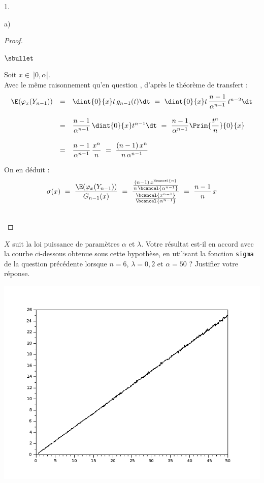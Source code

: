 \documentclass[11pt]{article}%
\begin{document}
\begin{noliste}{1.}
\begin{noliste}{a)}
\begin{proof}
\begin{noliste}{$\sbullet$}
	\item Soit $x \in \ ]0, \alpha[$.\\
	Avec le même raisonnement qu'en question , d'après 
	le théorème de transfert :
	\[
	  \begin{array}{rcl}
	    \E(\varphi_x(Y_{n-1})) & = & \dint{0}{x} t \, g_{n-1}(t) \dt
	    \ = \ \dint{0}{x} t \, \dfrac{n-1}{\alpha^{n-1}} \,
	    t^{n-2} \dt
	    \\[.6cm]
	    & = & \dfrac{n-1}{\alpha^{n-1}} \, \dint{0}{x} t^{n-1} \dt
	    \ = \ \dfrac{n-1}{\alpha^{n-1}} \Prim{\dfrac{t^n}{n}}
	    {0}{x}
	    \\[.6cm]
	    & = & \dfrac{n-1}{\alpha^{n-1}} \, \dfrac{x^n}{n}
	    \ = \ \dfrac{(n-1) \, x^n}{n \, \alpha^{n-1}}
	  \end{array}
	\]
	
	\item On en déduit : 
	\[
	  \sigma(x) \ = \ \dfrac{\E(\varphi_x(Y_{n-1}))}
	  {G_{n-1}(x)} \ = \ \dfrac{\frac{(n-1) \, x^{\bcancel{n}}}
	  {n \, \bcancel{\alpha^{n-1}}}}{\frac{\bcancel{x^{n-1}}}
	  {\bcancel{\alpha^{n-1}}}}
	  \ = \ \dfrac{n-1}{n} \,x
	\]
      \end{noliste}
      \conc{$\forall x \in \ ]0,\alpha[$, $\sigma(x) = \dfrac{n-1}{n}
      \, x$}~\\[-1cm]
    \end{proof}

    
    \item $X$ suit la loi puissance de paramètres $\alpha$ et $\lambda$.
    Votre résultat est-il en accord avec la courbe ci-dessous 
    obtenue sous cette hypothèse, en utilisant la fonction {\tt sigma}
    de la question précédente lorsque $n=6$, $\lambda=0,2$ et 
    $\alpha = 50$ ? Justifier votre réponse.
    
    \begin{center}
      \includegraphics[scale=.5]
      {Figures/ESSEC-I_2018/Figure_ESSEC-I_2018.png}
    \end{center}
    

\end{noliste}
\end{noliste}
\end{document}

